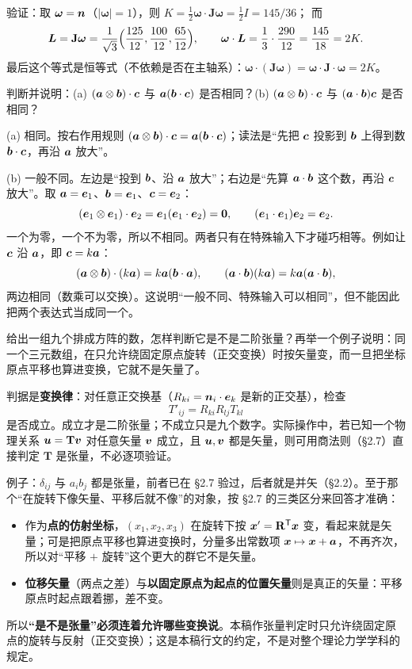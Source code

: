\documentclass[11pt]{ctexart}
\newcommand{\ten}[1]{\mathbf{#1}}
\begin{document}
验证：取 $\boldsymbol\omega=\boldsymbol{n}$（$|\boldsymbol\omega|=1$），则 $K=\frac12\boldsymbol\omega\cdot\ten J\boldsymbol\omega=\frac12I=145/36$；
而
\[
\vect L=\ten J\boldsymbol\omega=\frac{1}{\sqrt3}\Bigl(\frac{125}{12},\frac{100}{12},\frac{65}{12}\Bigr),
\qquad
\boldsymbol\omega\cdot\vect L=\frac{1}{3}\cdot\frac{290}{12}=\frac{145}{18}=2K .
\]
最后这个等式是恒等式（不依赖是否在主轴系）：$\boldsymbol\omega\cdot(\ten J\boldsymbol\omega)=\boldsymbol\omega\cdot\ten J\cdot\boldsymbol\omega=2K$。

{判断并说明：(a) $(\boldsymbol{a}\otimes\boldsymbol{b})\cdot\boldsymbol{c}$ 与 $\boldsymbol{a}(\boldsymbol{b}\cdot\boldsymbol{c})$ 是否相同？(b) $(\boldsymbol{a}\otimes\boldsymbol{b})\cdot\boldsymbol{c}$ 与 $(\boldsymbol{a}\cdot\boldsymbol{b})\boldsymbol{c}$ 是否相同？}

(a) 相同。按右作用规则 $(\boldsymbol{a}\otimes\boldsymbol{b})\cdot\boldsymbol{c}=\boldsymbol{a}(\boldsymbol{b}\cdot\boldsymbol{c})$；读法是“先把 $\boldsymbol{c}$ 投影到 $\boldsymbol{b}$ 上得到数 $\boldsymbol{b}\cdot\boldsymbol{c}$，再沿 $\boldsymbol{a}$ 放大”。

(b) 一般不同。左边是“投到 $\boldsymbol{b}$、沿 $\boldsymbol{a}$ 放大”；右边是“先算 $\boldsymbol{a}\cdot\boldsymbol{b}$ 这个数，再沿 $\boldsymbol{c}$ 放大”。取 $\boldsymbol{a}=\boldsymbol{e}_1$、$\boldsymbol{b}=\boldsymbol{e}_1$、$\boldsymbol{c}=\boldsymbol{e}_2$：
\[
(\boldsymbol{e}_1\otimes\boldsymbol{e}_1)\cdot\boldsymbol{e}_2=\boldsymbol{e}_1(\boldsymbol{e}_1\cdot\boldsymbol{e}_2)=\boldsymbol{0},
\qquad
(\boldsymbol{e}_1\cdot\boldsymbol{e}_1)\boldsymbol{e}_2=\boldsymbol{e}_2 .
\]
一个为零，一个不为零，所以不相同。两者只有在特殊输入下才碰巧相等。例如让 $\boldsymbol{c}$ 沿 $\boldsymbol{a}$，即 $\boldsymbol{c}=k\boldsymbol{a}$：
\[
(\boldsymbol{a}\otimes\boldsymbol{b})\cdot(k\boldsymbol{a})=k\boldsymbol{a}(\boldsymbol{b}\cdot\boldsymbol{a}),
\qquad
(\boldsymbol{a}\cdot\boldsymbol{b})(k\boldsymbol{a})=k\boldsymbol{a}(\boldsymbol{a}\cdot\boldsymbol{b}),
\]
两边相同（数乘可以交换）。这说明“一般不同、特殊输入可以相同”，但不能因此把两个表达式当成同一个。

{给出一组九个排成方阵的数，怎样判断它是不是二阶张量？再举一个例子说明：同一个三元数组，在只允许绕固定原点旋转（正交变换）时按矢量变，而一旦把坐标原点平移也算进变换，它就不是矢量了。}

判据是\textbf{变换律}：对任意正交换基（$R_{ki}=\boldsymbol{n}_i\cdot\boldsymbol{e}_k$ 是新的正交基），检查
\[
T'_{ij}=R_{ki}R_{lj}T_{kl}
\]
是否成立。成立才是二阶张量；不成立只是九个数字。实际操作中，若已知一个物理关系 $\vect u=\ten T\vect v$ 对任意矢量 $\boldsymbol{v}$ 成立，且 $\boldsymbol{u},\boldsymbol{v}$ 都是矢量，则可用商法则（\S2.7）直接判定 $\ten T$ 是张量，不必逐项验证。

例子：$\delta_{ij}$ 与 $a_ib_j$ 都是张量，前者已在 \S2.7 验过，后者就是并矢（\S2.2）。至于那个“在旋转下像矢量、平移后就不像”的对象，按 \S2.7 的三类区分来回答才准确：
\begin{itemize}[leftmargin=1.8em,itemsep=2pt]
\item 作为\textbf{点的仿射坐标}，$(x_1,x_2,x_3)$ 在旋转下按 $\vect x'=\ten R^{\mathsf T}\vect x$ 变，看起来就是矢量；可是把原点平移也算进变换时，分量多出常数项 $\boldsymbol{x}\mapsto\boldsymbol{x}+\boldsymbol{a}$，不再齐次，所以对“平移 $+$ 旋转”这个更大的群它不是矢量。
\item \textbf{位移矢量}（两点之差）与\textbf{以固定原点为起点的位置矢量}则是真正的矢量：平移原点时起点跟着挪，差不变。
\end{itemize}
所以\textbf{“是不是张量”必须连着允许哪些变换说}。本稿作张量判定时只允许绕固定原点的旋转与反射（正交变换）；这是本稿行文的约定，不是对整个理论力学学科的规定。
\end{document}
